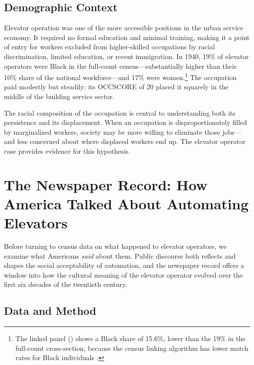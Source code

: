 \documentclass[12pt]{article}
\begin{document}
\subsection{Demographic Context}

Elevator operation was one of the more accessible positions in the urban service economy. It required no formal education and minimal training, making it a point of entry for workers excluded from higher-skilled occupations by racial discrimination, limited education, or recent immigration. In 1940, 19\% of elevator operators were Black in the full-count census---substantially higher than their 10\% share of the national workforce---and 17\% were women.\footnote{The linked panel () shows a Black share of 15.6\%, lower than the 19\% in the full-count cross-section, because the census linking algorithm has lower match rates for Black individuals \citep{abramitzky2021}.} The occupation paid modestly but steadily: its OCCSCORE of 20 placed it squarely in the middle of the building service sector.

The racial composition of the occupation is central to understanding both its persistence and its displacement. When an occupation is disproportionately filled by marginalized workers, society may be more willing to eliminate those jobs---and less concerned about where displaced workers end up. The elevator operator case provides evidence for this hypothesis.



\section{The Newspaper Record: How America Talked About Automating Elevators} \label{sec:newspaper}

Before turning to census data on what happened to elevator operators, we examine what Americans \emph{said} about them. Public discourse both reflects and shapes the social acceptability of automation, and the newspaper record offers a window into how the cultural meaning of the elevator operator evolved over the first six decades of the twentieth century.

\subsection{Data and Method}
\end{document}
